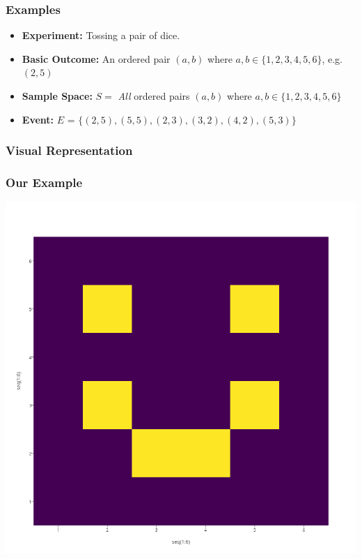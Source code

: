 \documentclass{beamer}
\begin{document}
\begin{frame}
\frametitle{Examples}
	\begin{itemize}
	    \item \textbf{Experiment:} Tossing a pair of dice.
	    \item \textbf{Basic Outcome:} An ordered pair $(a, b)$ where $a,b \in \{1, 2, 3, 4, 5, 6\}$, e.g.\ 
	    $(2,5)$
	    \item \textbf{Sample Space:} $S =$ \emph{All} ordered pairs $(a, b)$ where $a,b \in \{1, 2, 3, 4, 5, 
	    6\}$
        \item \textbf{Event:} $E$ = $\{(2,5), (5,5), (2,3), (3,2), (4,2), (5,3)\}$
    \end{itemize}
\end{frame}

\begin{frame}
\frametitle{Visual Representation}
	\begin{figure}
	\centering
	\end{figure}
\end{frame}

\begin{frame}
\frametitle{Our Example}
    \centering
    \includegraphics[scale=0.2]{./images/dieHeatMap.png}
\end{frame}
\end{document}
